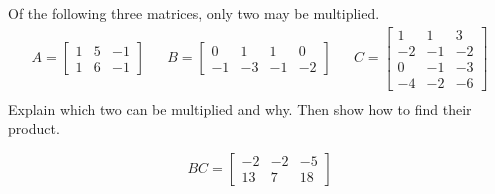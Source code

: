
\begin{exerciseStatement}


Of the following three matrices, only two may be multiplied. 
\begin{align*} A= \left[\begin{array}{ccc}
1 & 5 & -1 \\
1 & 6 & -1
\end{array}\right]  & & B= \left[\begin{array}{cccc}
0 & 1 & 1 & 0 \\
-1 & -3 & -1 & -2
\end{array}\right]  & & C= \left[\begin{array}{ccc}
1 & 1 & 3 \\
-2 & -1 & -2 \\
0 & -1 & -3 \\
-4 & -2 & -6
\end{array}\right]  \\ \end{align*}
             Explain which two can be multiplied and why. Then show how to find their product.


\end{exerciseStatement}
    
\begin{exerciseAnswer} 
\[BC= \left[\begin{array}{ccc}
-2 & -2 & -5 \\
13 & 7 & 18
\end{array}\right] \]
\end{exerciseAnswer}
    

